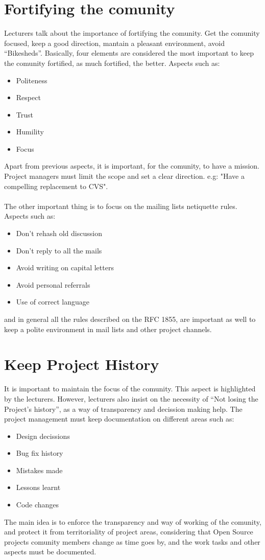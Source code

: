 \documentclass[11pt]{article}
\begin{document}
\section{Fortifying the comunity}
Lecturers talk about the importance of fortifying the comunity. Get the comunity focused, keep a good direction, mantain a pleasant environment, avoid ``Bikesheds''.
  Basically, four elements are considered the most important to keep the comunity fortified, as much fortified, the better. Aspects such as:
\begin{itemize}\itemsep0pt
\item{Politeness}
\item{Respect}
\item{Trust}
\item{Humility}
\item{Focus}
\end{itemize}
Apart from previous aspects, it is important, for the comunity, to have a mission. Project managers must limit the scope and set a clear direction. e.g: "Have a compelling replacement to CVS".\\
\\
The other important thing is to focus on the mailing lists netiquette rules. Aspects such as:
\begin{itemize}\itemsep0pt
\item{Don't rehash old discussion}
\item{Don't reply to all the mails}
\item{Avoid writing on capital letters}
\item{Avoid personal referrals}
\item{Use of correct language}
\end{itemize}
and in general all the rules described on the RFC 1855, are important as well to keep a polite environment in mail lists and other project channels.
\section{Keep Project History}
It is important to maintain the focus of the comunity. This aspect is highlighted by the lecturers. However, lecturers also insist on the necessity of ``Not losing the Project's history'', as a way of transparency and decission making help. The project management must keep documentation on different areas such as:
\begin{itemize}\itemsep0pt
\item{Design decissions}
\item{Bug fix history}
\item{Mistakes made}
\item{Lessons learnt}
\item{Code changes}
\end{itemize}
The main idea is to enforce the transparency and way of working of the comunity, and protect it from territoriality of project areas, considering that Open Source projects comunity members change as time goes by, and the work tasks and other aspects must be documented.
\end{document}
